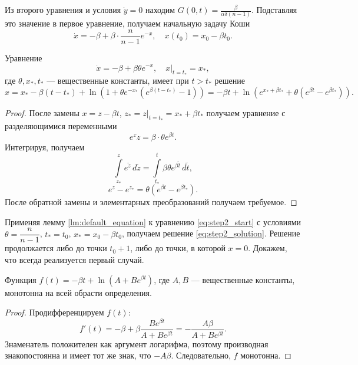 Из второго уравнения и условия $\dot{y} = 0$ находим $G(0, t) = \frac{\beta}{\alpha \delta (n - 1)}$. Подставляя это значение в первое уравнение, получаем начальную задачу Коши
\begin{equation}
	\label{eq:step2_start}
	\dot{x} = -\beta + \beta\cdot\dfrac{n}{n - 1}e^{-x}, \quad x(t_0) = x_0 - \beta t_0.
\end{equation}

\begin{lemma}
	\label{lm:default_equation}
	Уравнение 
	\[
	\dot{x} = -\beta + \beta \theta e^{-x}, \quad x \vert_{t = t_*} = x_*,
	\]
	где $\theta, x_*, t_*$ --- вещественные константы, имеет при $t > t_*$ решение 
	\[
	x = x_* - \beta (t - t_*) + \ln\left(1 + \theta e^{-x_*} (e^{\beta(t - t_*)} - 1)\right) =
	-\beta t + \ln\left(e^{x_* + \beta t_*} + \theta (e^{\beta t} - e^{\beta t_*})\right).
	\]
\end{lemma}

\begin{proof}
	После замены $x = z - \beta t$, $z_* = z \vert_{t = t_*} = x_* + \beta t_*$ получаем уравнение с разделяющимися переменными
	\[
	e^{z} \dot{z} = \beta \cdot \theta e^{\beta t}.
	\]
	Интегрируя, получаем
	\[
	\int\limits_{z_*}^z e^{\tilde{z}} \, d\tilde{z} = \int\limits_{t_*}^{t} \beta \theta e^{\beta \tilde{t}}\,d\tilde{t},
	\]
	\[
	e^z - e^{z_*} = \theta (e^{\beta t} - e^{\beta t_*}).
	\]
	После обратной замены и элементарных преобразований получаем требуемое.
\end{proof}

Применяя лемму \ref{lm:default_equation} к уравнению \eqref{eq:step2_start} с условиями $\theta = \dfrac{n}{n - 1}$, $t_* = t_0$, $x_* = x_0 - \beta t_0$, получаем решение \eqref{eq:step2_solution}. Решение продолжается либо до точки $t_0 + 1$, либо до точки, в которой $x = 0$. Докажем, что всегда реализуется первый случай.

\begin{lemma}
	\label{lm:solution_monotone}
	Функция $f(t) = -\beta t + \ln\left(A + B e^{\beta t}\right)$, где $A, B$ --- вещественные константы, монотонна на всей обрасти определения.
\end{lemma}
\begin{proof}
	Продифференцируем $f(t)$:
	\[
	f'(t) = -\beta + \beta \dfrac{B e^{\beta t}}{A + B e^{\beta t}} = -\dfrac{A \beta}{A + B e^{\beta t}}.
	\]
	Знаменатель положителен как аргумент логарифма, поэтому производная знакопостоянна и имеет тот же знак, что $-A \beta$. Следовательно, $f$ монотонна.
\end{proof}

